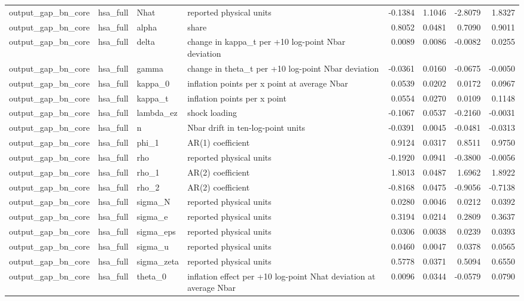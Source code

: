 \begin{tabular}{llllrrrr}
output\_gap\_bn\_core & hsa\_full & Nhat & reported physical units & -0.1384 & 1.1046 & -2.8079 & 1.8327 \\
output\_gap\_bn\_core & hsa\_full & alpha & share & 0.8052 & 0.0481 & 0.7090 & 0.9011 \\
output\_gap\_bn\_core & hsa\_full & delta & change in kappa\_t per +10 log-point Nbar deviation & 0.0089 & 0.0086 & -0.0082 & 0.0255 \\
output\_gap\_bn\_core & hsa\_full & gamma & change in theta\_t per +10 log-point Nbar deviation & -0.0361 & 0.0160 & -0.0675 & -0.0050 \\
output\_gap\_bn\_core & hsa\_full & kappa\_0 & inflation points per x point at average Nbar & 0.0539 & 0.0202 & 0.0172 & 0.0967 \\
output\_gap\_bn\_core & hsa\_full & kappa\_t & inflation points per x point & 0.0554 & 0.0270 & 0.0109 & 0.1148 \\
output\_gap\_bn\_core & hsa\_full & lambda\_ez & shock loading & -0.1067 & 0.0537 & -0.2160 & -0.0031 \\
output\_gap\_bn\_core & hsa\_full & n & Nbar drift in ten-log-point units & -0.0391 & 0.0045 & -0.0481 & -0.0313 \\
output\_gap\_bn\_core & hsa\_full & phi\_1 & AR(1) coefficient & 0.9124 & 0.0317 & 0.8511 & 0.9750 \\
output\_gap\_bn\_core & hsa\_full & rho & reported physical units & -0.1920 & 0.0941 & -0.3800 & -0.0056 \\
output\_gap\_bn\_core & hsa\_full & rho\_1 & AR(2) coefficient & 1.8013 & 0.0487 & 1.6962 & 1.8922 \\
output\_gap\_bn\_core & hsa\_full & rho\_2 & AR(2) coefficient & -0.8168 & 0.0475 & -0.9056 & -0.7138 \\
output\_gap\_bn\_core & hsa\_full & sigma\_N & reported physical units & 0.0280 & 0.0046 & 0.0212 & 0.0392 \\
output\_gap\_bn\_core & hsa\_full & sigma\_e & reported physical units & 0.3194 & 0.0214 & 0.2809 & 0.3637 \\
output\_gap\_bn\_core & hsa\_full & sigma\_eps & reported physical units & 0.0306 & 0.0038 & 0.0239 & 0.0393 \\
output\_gap\_bn\_core & hsa\_full & sigma\_u & reported physical units & 0.0460 & 0.0047 & 0.0378 & 0.0565 \\
output\_gap\_bn\_core & hsa\_full & sigma\_zeta & reported physical units & 0.5778 & 0.0371 & 0.5094 & 0.6550 \\
output\_gap\_bn\_core & hsa\_full & theta\_0 & inflation effect per +10 log-point Nhat deviation at average Nbar & 0.0096 & 0.0344 & -0.0579 & 0.0790 \\

\end{tabular}
